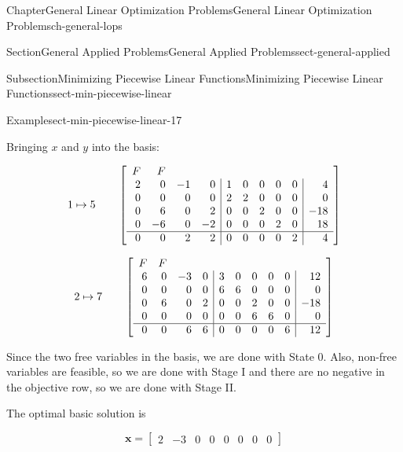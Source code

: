 \documentclass[oneside,10pt,]{book}
\numberwithin{equation}{section}
\newcommand{\amp}{&}
\begin{document}
\begin{chapterptx}{Chapter}{General Linear Optimization Problems}{}{General Linear Optimization Problems}{}{}{ch-general-lops}
\begin{sectionptx}{Section}{General Applied Problems}{}{General Applied Problems}{}{}{sect-general-applied}
\begin{subsectionptx}{Subsection}{Minimizing Piecewise Linear Functions}{}{Minimizing Piecewise Linear Functions}{}{}{sect-min-piecewise-linear}
\begin{example}{Example}{}{sect-min-piecewise-linear-17}
\par
Bringing \(x\) and \(y\) into the basis:%
\par
%
\begin{equation*}
1 \mapsto 5 \qquad \left[\begin{array}{rrrr|rrrrr|r}
{\small F} \amp {\small F} \\
2 \amp 0 \amp -1 \amp 0 \amp 1 \amp 0 \amp 0 \amp 0 \amp 0 \amp 4\\
0 \amp 0 \amp 0 \amp 0 \amp 2 \amp 2 \amp 0 \amp 0 \amp 0 \amp 0\\
0 \amp 6 \amp 0 \amp 2 \amp 0 \amp 0 \amp 2 \amp 0 \amp 0 \amp -18\\
0 \amp -6 \amp 0 \amp -2 \amp 0 \amp 0 \amp 0 \amp 2 \amp 0 \amp 18\\ \hline
0 \amp 0 \amp 2 \amp 2 \amp 0 \amp 0 \amp 0 \amp 0 \amp 2 \amp 4\\
\end{array} \right]
\end{equation*}
%
\par
%
\begin{equation*}
2 \mapsto 7 \qquad \left[\begin{array}{rrrr|rrrrr|r}
{\small F} \amp {\small F} \\
6 \amp 0 \amp -3 \amp 0 \amp 3 \amp 0 \amp 0 \amp 0 \amp 0 \amp 12\\
0 \amp 0 \amp 0 \amp 0 \amp 6 \amp 6 \amp 0 \amp 0 \amp 0 \amp 0\\
0 \amp 6 \amp 0 \amp 2 \amp 0 \amp 0 \amp 2 \amp 0 \amp 0 \amp -18\\
0 \amp 0 \amp 0 \amp 0 \amp 0 \amp 0 \amp 6 \amp 6 \amp 0 \amp 0\\ \hline
0 \amp 0 \amp 6 \amp 6 \amp 0 \amp 0 \amp 0 \amp 0 \amp 6 \amp 12\\
\end{array} \right]
\end{equation*}
%
\par
Since the two free variables in the basis, we are done with State 0.  Also, non-free variables are feasible, so we are done with Stage I and there are no negative in the objective row, so we are done with Stage II.%
\par
The optimal basic solution is%
\par
%
\begin{equation*}
\boldsymbol{x} = \left[\begin{array}{rrrr|rrrr}
2 \amp -3 \amp 0 \amp 0 \amp 0 \amp 0 \amp 0 \amp 0
\end{array}\right]
\end{equation*}

\end{example}
\end{subsectionptx}
\end{sectionptx}
\end{chapterptx}
\end{document}

